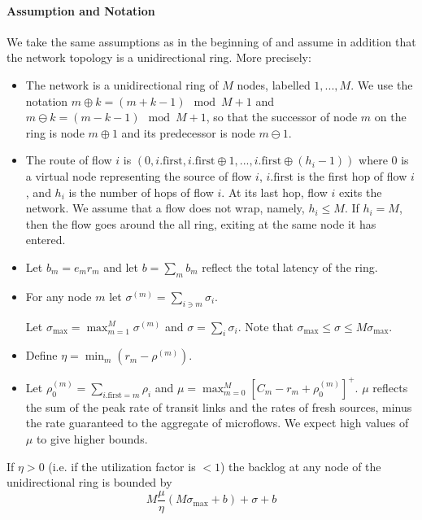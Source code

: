 \paragraph{Assumption and Notation}
We take the same assumptions as in the beginning of  and assume in
addition that the network topology is a unidirectional ring. More precisely:
\begin{itemize}
\item
The network is a unidirectional ring of $M$ nodes, labelled
$1,..., M$.
  We use the notation $m \oplus k= (m + k -1) \mod M + 1$
  and $m \ominus k= (m-k-1) \mod M + 1$,
  so that the successor of node $m$ on the ring is node $m \oplus 1$ and its
  predecessor is node $m \ominus 1$.

\item  The route of flow $i$ is $(0, i.\mathrm{first},
i.\mathrm{first}\oplus 1, ..., i.\mathrm{first}\oplus (h_i-1))$
where $0$ is a virtual node representing the source of flow $i$,
$i.\mathrm{first}$ is the first hop of flow $i$, and $h_i$ is the
number of hops of flow $i$.  At its last hop, flow $i$ exits the
network. We assume that a flow does not wrap, namely, $h_i \leq
M$. If $h_i=M$, then the flow goes around the all ring, exiting at
the same node it has entered.
\item Let $b_m=e_m r_m$ and let $b= \sum_m b_m$ reflect the total latency of the ring.

\item  For any node  $m$ let $\sigma^{(m)} = \sum_{i \ni m} \sigma_i$.

Let $\sigma_{\max}= \max_{m=1}^M \sigma^{(m)}$ and $\sigma= \sum_i
\sigma_i$. Note that $\sigma_{\max} \leq \sigma \leq M
\sigma_{\max}$.

\item  Define
$\eta= \min_m(r_m - \rho^{(m)})$.

\item Let $\rho^{(m)}_0=\sum_{i.\mathrm{first}=m}\rho_i$ and
$\mu= \max_{m=0}^M \left[ C_m - r_m + \rho^{(m)}_0\right]^+$. $\mu$
reflects the sum of the peak rate of transit links and the rates
of fresh sources, minus the rate guaranteed to the aggregate of
microflows. We expect high values of $\mu$ to give higher bounds.
\end{itemize}

\begin{theorem}
If $\eta >0$ (i.e. if the utilization factor is $<1$) the backlog
at any node of the unidirectional ring is bounded by
$$M \frac{\mu}{\eta} \left( M \sigma_{\max} + b \right) + \sigma +
b
$$
\end{theorem}


